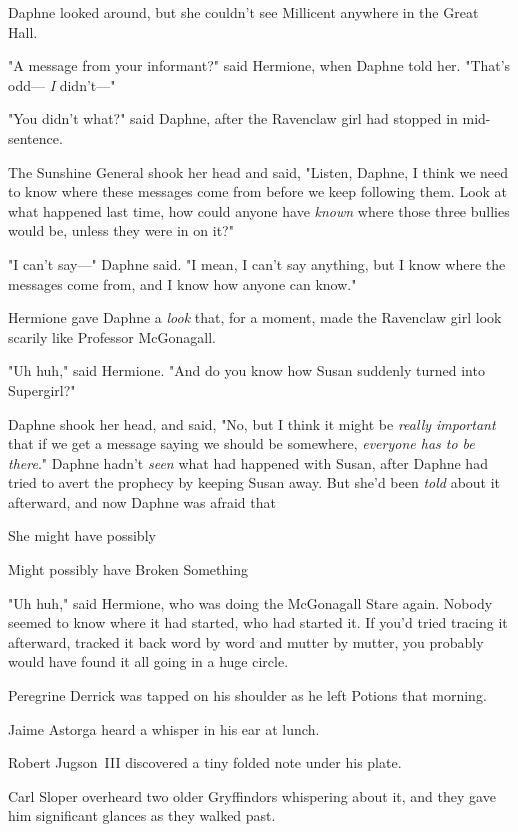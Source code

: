 Daphne looked around, but she couldn't see Millicent anywhere in the Great Hall.

"A message from your informant?" said Hermione, when Daphne told her. "That's
odd--- \emph{I} didn't---"

"You didn't what?" said Daphne, after the Ravenclaw girl had stopped in
mid-sentence.

The Sunshine General shook her head and said, "Listen, Daphne, I think we need
to know where these messages come from before we keep following them. Look at
what happened last time, how could anyone have \emph{known} where those three
bullies would be, unless they were in on it?"

"I can't say---" Daphne said. "I mean, I can't say anything, but I know where
the messages come from, and I know how anyone can know."

Hermione gave Daphne a \emph{look} that, for a moment, made the Ravenclaw girl
look scarily like Professor McGonagall.

"Uh huh," said Hermione. "And do you know how Susan suddenly turned into
Supergirl?"

Daphne shook her head, and said, "No, but I think it might be \emph{really
important} that if we get a message saying we should be somewhere,
\emph{everyone has to be there}." Daphne hadn't \emph{seen} what had happened
with Susan, after Daphne had tried to avert the prophecy by keeping Susan away.
But she'd been \emph{told} about it afterward, and now Daphne was afraid
that{\el}

She might have possibly{\el}

Might possibly have Broken Something{\el}

"Uh huh," said Hermione, who was doing the McGonagall Stare again.
\sbreak
Nobody seemed to know where it had started, who had started it. If you'd tried
tracing it afterward, tracked it back word by word and mutter by mutter, you
probably would have found it all going in a huge circle.

Peregrine Derrick was tapped on his shoulder as he left Potions that morning.

Jaime Astorga heard a whisper in his ear at lunch.

Robert Jugson~III discovered a tiny folded note under his plate.

Carl Sloper overheard two older Gryffindors whispering about it, and they gave
him significant glances as they walked past.

